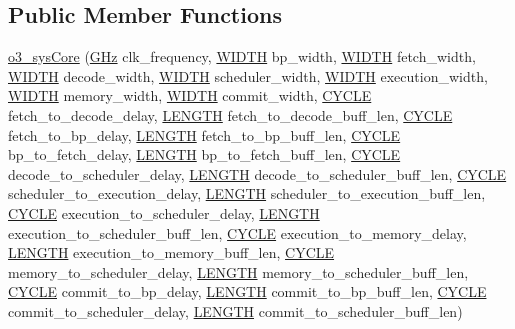 \subsection*{Public Member Functions}
\begin{DoxyCompactItemize}
\item 
\hyperlink{classo3__sysCore_aa2fc24a24dd599ff3393c62910cbcb06}{o3\_\-sysCore} (\hyperlink{global_2global_8h_a32516e1b668a88eb546e9b6ee2e3345d}{GHz} clk\_\-frequency, \hyperlink{global_2global_8h_a6fa2e24b8a418fa215e183264cbea3aa}{WIDTH} bp\_\-width, \hyperlink{global_2global_8h_a6fa2e24b8a418fa215e183264cbea3aa}{WIDTH} fetch\_\-width, \hyperlink{global_2global_8h_a6fa2e24b8a418fa215e183264cbea3aa}{WIDTH} decode\_\-width, \hyperlink{global_2global_8h_a6fa2e24b8a418fa215e183264cbea3aa}{WIDTH} scheduler\_\-width, \hyperlink{global_2global_8h_a6fa2e24b8a418fa215e183264cbea3aa}{WIDTH} execution\_\-width, \hyperlink{global_2global_8h_a6fa2e24b8a418fa215e183264cbea3aa}{WIDTH} memory\_\-width, \hyperlink{global_2global_8h_a6fa2e24b8a418fa215e183264cbea3aa}{WIDTH} commit\_\-width, \hyperlink{global_2global_8h_a7e19a550ec11d1ed921deb20c22efb5b}{CYCLE} fetch\_\-to\_\-decode\_\-delay, \hyperlink{global_2global_8h_ad7ec63c69447a2b630929c8e0197860d}{LENGTH} fetch\_\-to\_\-decode\_\-buff\_\-len, \hyperlink{global_2global_8h_a7e19a550ec11d1ed921deb20c22efb5b}{CYCLE} fetch\_\-to\_\-bp\_\-delay, \hyperlink{global_2global_8h_ad7ec63c69447a2b630929c8e0197860d}{LENGTH} fetch\_\-to\_\-bp\_\-buff\_\-len, \hyperlink{global_2global_8h_a7e19a550ec11d1ed921deb20c22efb5b}{CYCLE} bp\_\-to\_\-fetch\_\-delay, \hyperlink{global_2global_8h_ad7ec63c69447a2b630929c8e0197860d}{LENGTH} bp\_\-to\_\-fetch\_\-buff\_\-len, \hyperlink{global_2global_8h_a7e19a550ec11d1ed921deb20c22efb5b}{CYCLE} decode\_\-to\_\-scheduler\_\-delay, \hyperlink{global_2global_8h_ad7ec63c69447a2b630929c8e0197860d}{LENGTH} decode\_\-to\_\-scheduler\_\-buff\_\-len, \hyperlink{global_2global_8h_a7e19a550ec11d1ed921deb20c22efb5b}{CYCLE} scheduler\_\-to\_\-execution\_\-delay, \hyperlink{global_2global_8h_ad7ec63c69447a2b630929c8e0197860d}{LENGTH} scheduler\_\-to\_\-execution\_\-buff\_\-len, \hyperlink{global_2global_8h_a7e19a550ec11d1ed921deb20c22efb5b}{CYCLE} execution\_\-to\_\-scheduler\_\-delay, \hyperlink{global_2global_8h_ad7ec63c69447a2b630929c8e0197860d}{LENGTH} execution\_\-to\_\-scheduler\_\-buff\_\-len, \hyperlink{global_2global_8h_a7e19a550ec11d1ed921deb20c22efb5b}{CYCLE} execution\_\-to\_\-memory\_\-delay, \hyperlink{global_2global_8h_ad7ec63c69447a2b630929c8e0197860d}{LENGTH} execution\_\-to\_\-memory\_\-buff\_\-len, \hyperlink{global_2global_8h_a7e19a550ec11d1ed921deb20c22efb5b}{CYCLE} memory\_\-to\_\-scheduler\_\-delay, \hyperlink{global_2global_8h_ad7ec63c69447a2b630929c8e0197860d}{LENGTH} memory\_\-to\_\-scheduler\_\-buff\_\-len, \hyperlink{global_2global_8h_a7e19a550ec11d1ed921deb20c22efb5b}{CYCLE} commit\_\-to\_\-bp\_\-delay, \hyperlink{global_2global_8h_ad7ec63c69447a2b630929c8e0197860d}{LENGTH} commit\_\-to\_\-bp\_\-buff\_\-len, \hyperlink{global_2global_8h_a7e19a550ec11d1ed921deb20c22efb5b}{CYCLE} commit\_\-to\_\-scheduler\_\-delay, \hyperlink{global_2global_8h_ad7ec63c69447a2b630929c8e0197860d}{LENGTH} commit\_\-to\_\-scheduler\_\-buff\_\-len)

\end{DoxyCompactItemize}
